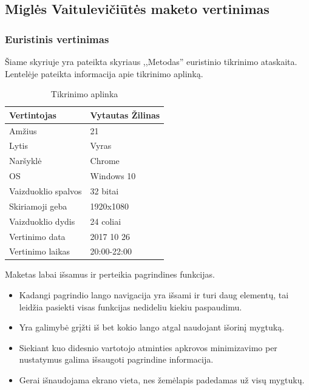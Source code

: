 \documentclass{VUMIFPSkursinis}
\begin{document}
\subsection{Miglės Vaitulevičiūtės maketo vertinimas}

\subsubsection{Euristinis vertinimas}

Šiame skyriuje yra pateikta skyriaus ,,Metodas'' euristinio tikrinimo ataskaita.
Lentelėje pateikta informacija apie tikrinimo aplinką.

\begin{table}[H]\footnotesize
  \centering
  \caption{Tikrinimo aplinka}
  \begin{tabular}{|p{}|p{}|}
	\hline
	Vertintojas & Vytautas Žilinas\\
	\hline
	Amžius & 21 \\
	\hline
	Lytis & Vyras \\
	\hline
	Naršyklė & Chrome \\
	\hline
	OS & Windows 10 \\
	\hline
	Vaizduoklio spalvos & 32 bitai \\
	\hline
	Skiriamoji geba & 1920x1080 \\
	\hline
	Vaizduoklio dydis & 24 coliai \\
	\hline
	Vertinimo data & 2017 10 26 \\
	\hline
	Vertinimo laikas & 20:00-22:00 \\
    \hline
  \end{tabular}
  \label{tab:table example}
\end{table}


Maketas labai išsamus ir perteikia pagrindines funkcijas.
\begin{itemize}
\item Kadangi pagrindio lango navigacija yra išsami ir turi daug elementų, tai leidžia pasiekti visas funkcijas nedideliu kiekiu paspaudimu.
\item Yra galimybė grįžti iš bet kokio lango atgal naudojant išorinį mygtuką. 
\item Siekiant kuo didesnio vartotojo atminties apkrovos minimizavimo per nustatymus galima išsaugoti pagrindine informacija.
\item Gerai išnaudojama ekrano vieta, nes žemėlapis padedamas už visų mygtukų.
\end{itemize}
\end{document}
